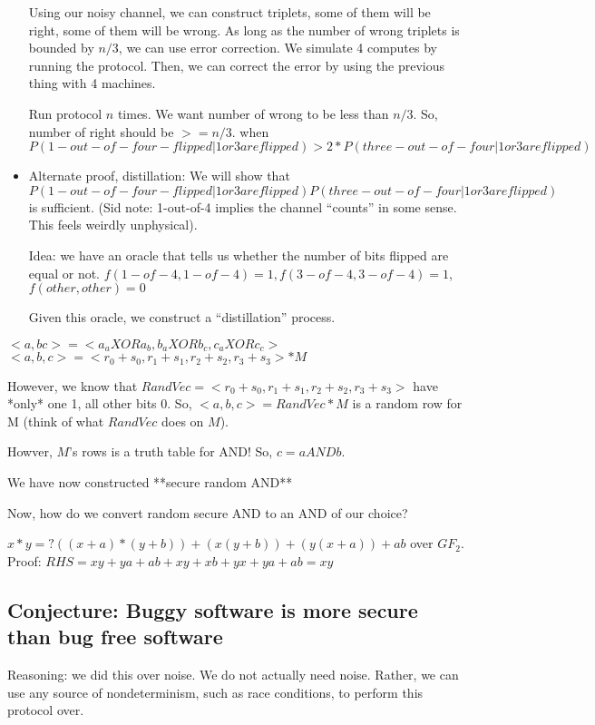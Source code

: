 \begin{itemize}
  Using our noisy channel, we can construct triplets, some of them will be right, some of them will be wrong.
  As long as the number of wrong triplets is bounded by $n/3$, we can use error correction.
  We simulate 4 computes by running the protocol. Then, we can correct the error by using the previous thing with 4 machines.

  Run protocol $n$ times. We want number of wrong to be less than $n / 3$. So, number of right should be $>= n / 3$.
  when $P(1-out-of-four-flipped | 1 or 3 are flipped) > 2 * P(three-out-of-four | 1 or 3 are flipped)$


\item Alternate proof, distillation:
  We will show that $P(1-out-of-four-flipped | 1 or 3 are flipped) P(three-out-of-four | 1 or 3 are flipped)$ is sufficient.
  (Sid note: 1-out-of-4 implies the channel ``counts'' in some sense. This feels weirdly unphysical).

  Idea: we have an oracle that tells us whether the number of bits flipped are equal or not. $f(1-of-4, 1-of-4) = 1, f(3-of-4, 3-of-4) = 1$,
  $f(other, other) = 0$

  Given this oracle, we construct a ``distillation'' process.



  


\end{itemize}


$<a, b c> = <a_a XOR a_b, b_a XOR b_c, c_a XOR c_c>$
$<a, b, c> = <r_0 + s_0, r_1 + s_1, r_2 + s_2, r_3 + s_3> * M$

However, we know that $RandVec = <r_0 + s_0, r_1 + s_1, r_2 + s_2, r_3 + s_3>$ have *only* one 1, all other bits 0.
So, $<a, b, c> = RandVec * M$ is a random row for M (think of what $RandVec$ does on $M$).

Howver, $M$'s rows is a truth table for AND! So, $c = a AND b$.

We have now constructed **secure random AND**


Now, how do we convert random secure AND to an AND of our choice?




$x * y =? ((x + a) * (y + b)) + (x(y + b)) + (y(x + a)) + ab$ over $GF_2$.
Proof:
$RHS = xy + ya + ab + xy + xb + yx + ya + ab = xy$



\subsection{Conjecture: Buggy software is more secure than bug free software}

Reasoning: we did this over noise. We do not actually need noise. Rather, we can
use any source of nondeterminism, such as race conditions, to perform this protocol over.
